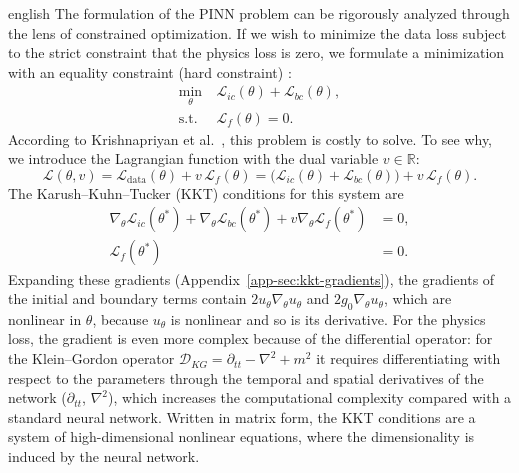 \documentclass[12pt,letterpaper,twoside]{book}
\newcommand{\Loss}{\mathcal{L}}
\begin{document}
\begin{hyphenrules}{english}
The formulation of the PINN problem can be rigorously analyzed through the lens of constrained
optimization. If we wish to minimize the data loss subject to the strict constraint that the physics
loss is zero, we formulate a minimization with an equality constraint (hard constraint)
\cite{krishnapriyan2021}:
\begin{align}
  \min_{\theta}\ &\Loss_{ic}(\theta)+\Loss_{bc}(\theta), \label{eq:hard-obj}\\
  \text{s.t. }\ &\Loss_f(\theta)=0. \label{eq:hard-constraint}
\end{align}
According to Krishnapriyan et al.~\cite{krishnapriyan2021}, this problem is costly to solve. To see why, we introduce the
Lagrangian function with the dual variable $v\in\mathbb{R}$:
\begin{equation}
  \mathscr{L}(\theta,v)=\Loss_{\mathrm{data}}(\theta)+v\,\Loss_f(\theta)
  =\big(\Loss_{ic}(\theta)+\Loss_{bc}(\theta)\big)+v\,\Loss_f(\theta).
  \label{eq:lagrangian}
\end{equation}
The Karush--Kuhn--Tucker (KKT) conditions for this system are \cite{boyd2004}
\begin{align}
  \nabla_\theta\Loss_{ic}(\theta^{*})+\nabla_\theta\Loss_{bc}(\theta^{*})+v\nabla_\theta\Loss_f(\theta^{*})&=0, \label{eq:kkt-1}\\
  \Loss_f(\theta^{*})&=0. \label{eq:kkt-2}
\end{align}
Expanding these gradients (Appendix~\ref{app-sec:kkt-gradients}), the gradients of the initial and boundary
terms contain $2u_\theta\nabla_\theta u_\theta$ and $2g_0\nabla_\theta u_\theta$, which are nonlinear in
$\theta$, because $u_\theta$ is nonlinear and so is its derivative. For the physics loss, the gradient is
even more complex because of the differential operator: for the Klein--Gordon operator
$\mathcal{D}_{KG}=\partial_{tt}-\nabla^2+m^2$ it requires differentiating with respect to the parameters
through the temporal and spatial derivatives of the network ($\partial_{tt}$, $\nabla^2$), which increases
the computational complexity compared with a standard neural network. Written in matrix form, the KKT
conditions are a system of high-dimensional nonlinear equations, where the dimensionality is induced by
the neural network.


\end{hyphenrules}
\end{document}
